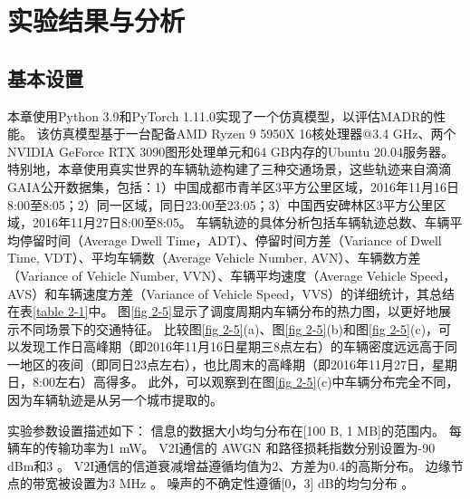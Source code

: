 \section{实验结果与分析}\label{section 2-6}

\subsection{基本设置}
本章使用Python 3.9和PyTorch 1.11.0实现了一个仿真模型，以评估MADR的性能。
该仿真模型基于一台配备AMD Ryzen 9 5950X 16核处理器@3.4 GHz、两个NVIDIA GeForce RTX 3090图形处理单元和64 GB内存的Ubuntu 20.04服务器。
特别地，本章使用真实世界的车辆轨迹构建了三种交通场景，这些轨迹来自滴滴GAIA公开数据集，包括：1）中国成都市青羊区3平方公里区域，2016年11月16日8:00至8:05；2）同一区域，同日23:00至23:05；3）中国西安碑林区3平方公里区域，2016年11月27日8:00至8:05。
车辆轨迹的具体分析包括车辆轨迹总数、车辆平均停留时间（Average Dwell Time，ADT）、停留时间方差（Variance of Dwell Time, VDT）、平均车辆数（Average Vehicle Number, AVN）、车辆数方差（Variance of Vehicle Number, VVN）、车辆平均速度（Average Vehicle Speed，AVS）和车辆速度方差（Variance of Vehicle Speed，VVS）的详细统计，其总结在表\ref{table 2-1}中。
图\ref{fig 2-5}显示了调度周期内车辆分布的热力图，以更好地展示不同场景下的交通特征。
比较图\ref{fig 2-5}(a)、图\ref{fig 2-5}(b)和图\ref{fig 2-5}(c)，可以发现工作日高峰期（即2016年11月16日星期三8点左右）的车辆密度远远高于同一地区的夜间（即同日23点左右），也比周末的高峰期（即2016年11月27日，星期日，8:00左右）高得多。
此外，可以观察到在图\ref{fig 2-5}(c)中车辆分布完全不同，因为车辆轨迹是从另一个城市提取的。

实验参数设置描述如下：
信息的数据大小均匀分布在[100 B, 1 MB]的范围内。
每辆车的传输功率为1 mW。
V2I通信的 AWGN 和路径损耗指数分别设置为-90 dBm和3 \cite{sadek2009distributed}。
V2I通信的信道衰减增益遵循均值为2、方差为0.4的高斯分布。
边缘节点的带宽被设置为3 MHz \cite{wang2019delay}。
噪声的不确定性遵循[0，3] dB的均匀分布 \cite{tandra2008snr}。

\begin{table}[h]\small
\centering
{}
\label{table 2-1}
\end{table}

